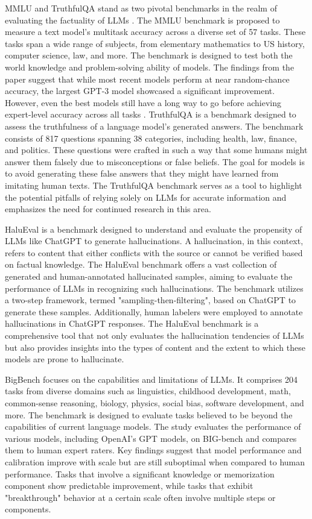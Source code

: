 MMLU \citep{MMLU} and TruthfulQA \citep{TruthfulQA} stand as two pivotal benchmarks in the realm of evaluating the factuality of LLMs \citep{GPT4,llama2,Open-LLM-Leaderboard} . 
The MMLU benchmark is proposed to measure a text model's multitask accuracy across a diverse set of 57 tasks. These tasks span a wide range of subjects, from elementary mathematics to US history, computer science, law, and more. The benchmark is designed to test both the world knowledge and problem-solving ability of models. The findings from the paper suggest that while most recent models perform at near random-chance accuracy, the largest GPT-3 model showcased a significant improvement. However, even the best models still have a long way to go before achieving expert-level accuracy across all tasks \citep{GPT4}.
TruthfulQA is a benchmark designed to assess the truthfulness of a language model's generated answers. The benchmark consists of 817 questions spanning 38 categories, including health, law, finance, and politics. These questions were crafted in such a way that some humans might answer them falsely due to misconceptions or false beliefs. The goal for models is to avoid generating these false answers that they might have learned from imitating human texts. The TruthfulQA benchmark serves as a tool to highlight the potential pitfalls of relying solely on LLMs for accurate information and emphasizes the need for continued research in this area.


HaluEval \citep{HaluEval} is a benchmark designed to understand and evaluate the propensity of LLMs like ChatGPT to generate hallucinations. A hallucination, in this context, refers to content that either conflicts with the source or cannot be verified based on factual knowledge.
The HaluEval benchmark offers a vast collection of generated and human-annotated hallucinated samples, aiming to evaluate the performance of LLMs in recognizing such hallucinations. The benchmark utilizes a two-step framework, termed "sampling-then-filtering", based on ChatGPT to generate these samples. Additionally, human labelers were employed to annotate hallucinations in ChatGPT responses. The HaluEval benchmark is a comprehensive tool that not only evaluates the hallucination tendencies of LLMs but also provides insights into the types of content and the extent to which these models are prone to hallucinate. 

BigBench \citep{BigBench} focuses on the capabilities and limitations of LLMs. It comprises 204 tasks from diverse domains such as linguistics, childhood development, math, common-sense reasoning, biology, physics, social bias, software development, and more. The benchmark is designed to evaluate tasks believed to be beyond the capabilities of current language models. The study evaluates the performance of various models, including OpenAI's GPT models, on BIG-bench and compares them to human expert raters. Key findings suggest that model performance and calibration improve with scale but are still suboptimal when compared to human performance. Tasks that involve a significant knowledge or memorization component show predictable improvement, while tasks that exhibit "breakthrough" behavior at a certain scale often involve multiple steps or components. 

